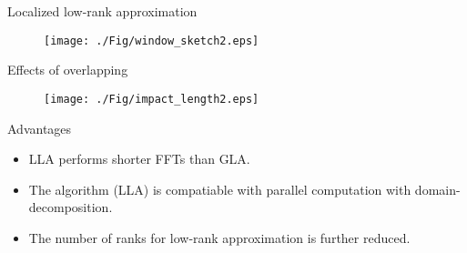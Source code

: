 \documentclass[aspectratio=43]{beamer}
\begin{document}
\begin{frame}{Localized low-rank approximation}
  \begin{figure}
  \texttt{[image: ./Fig/window\_sketch2.eps]}
  \end{figure}

\end{frame}
\begin{frame}{Effects of overlapping}
  \begin{figure}
  \texttt{[image: ./Fig/impact\_length2.eps]}
  \end{figure}
\end{frame}
\begin{frame}{Advantages}
\begin{itemize}
\item{LLA performs shorter FFTs than GLA.}
\item{The algorithm (LLA) is compatiable with parallel computation with domain-decomposition.}
\item{The number of ranks for low-rank approximation is further reduced.}
\end{itemize}
\end{frame}
\end{document}
